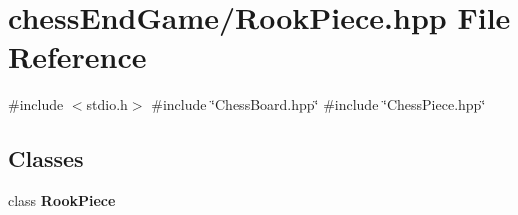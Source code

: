 \section{chess\+End\+Game/\+Rook\+Piece.hpp File Reference}
\label{_rook_piece_8hpp}
{\ttfamily \#include $<$stdio.\+h$>$}\newline
{\ttfamily \#include \char`\"{}Chess\+Board.\+hpp\char`\"{}}\newline
{\ttfamily \#include \char`\"{}Chess\+Piece.\+hpp\char`\"{}}\newline
\subsection*{Classes}
\begin{DoxyCompactItemize}
\item 
class \textbf{ Rook\+Piece}
\end{DoxyCompactItemize}

